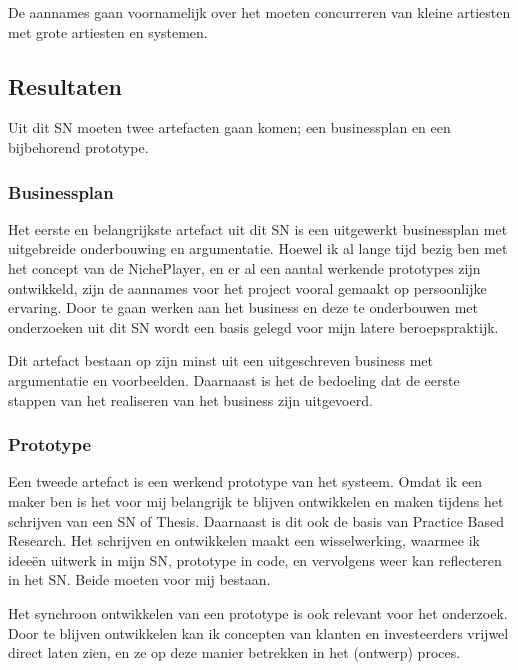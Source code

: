 De aannames gaan voornamelijk over het moeten concurreren van kleine artiesten met grote artiesten en systemen.

\subsection{Resultaten}
Uit dit SN moeten twee artefacten gaan komen; een businessplan en een bijbehorend prototype.

\subsubsection*{Businessplan}
Het eerste en belangrijkste artefact uit dit SN is een uitgewerkt businessplan met uitgebreide onderbouwing en argumentatie. Hoewel ik al lange tijd bezig ben met het concept van de NichePlayer, en er al een aantal werkende prototypes zijn ontwikkeld, zijn de aannames voor het project vooral gemaakt op persoonlijke ervaring. Door te gaan werken aan het business en deze te onderbouwen met onderzoeken uit dit SN wordt een basis gelegd voor mijn latere beroepspraktijk.

Dit artefact bestaan op zijn minst uit een uitgeschreven business met argumentatie en voorbeelden. Daarnaast is het de bedoeling dat de eerste stappen van het realiseren van het business zijn uitgevoerd.

\subsubsection*{Prototype}
Een tweede artefact is een werkend prototype van het systeem. Omdat ik een maker ben is het voor mij belangrijk te blijven ontwikkelen en maken tijdens het schrijven van een SN of Thesis. Daarnaast is dit ook de basis van Practice Based Research. Het schrijven en ontwikkelen maakt een wisselwerking, waarmee ik ideeën uitwerk in mijn SN, prototype in code, en vervolgens weer kan reflecteren in het SN. Beide moeten voor mij bestaan.

Het synchroon ontwikkelen van een prototype is ook relevant voor het onderzoek. Door te blijven ontwikkelen kan ik concepten van klanten en investeerders vrijwel direct laten zien, en ze op deze manier betrekken in het (ontwerp) proces.

